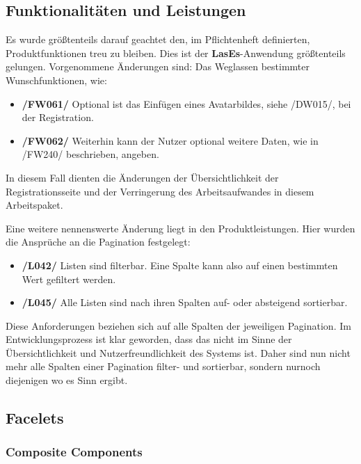 \subsection{Funktionalitäten und Leistungen}

Es wurde größtenteils darauf geachtet den, im Pflichtenheft definierten, Produktfunktionen treu zu bleiben.
Dies ist der \textbf{LasEs}-Anwendung größtenteils gelungen.
Vorgenommene Änderungen sind:
\newline
Das Weglassen bestimmter Wunschfunktionen, wie:
\begin{itemize}
    \item \textbf{/FW061/} Optional ist das Einfügen eines Avatarbildes, siehe /DW015/, bei der Registration.
    \item \textbf{/FW062/} Weiterhin kann der Nutzer optional weitere Daten, wie in /FW240/ beschrieben, angeben.
\end{itemize}
In diesem Fall dienten die Änderungen der Übersichtlichkeit der Registrationsseite und der
Verringerung des Arbeitsaufwandes in diesem Arbeitspaket.

\newline
Eine weitere nennenswerte Änderung liegt in den Produktleistungen.
Hier wurden die Ansprüche an die Pagination festgelegt:
\begin{itemize}
    \item \textbf{/L042/} Listen sind filterbar.
    Eine Spalte kann also auf einen bestimmten Wert gefiltert werden.
    \item \textbf{/L045/} Alle Listen sind nach ihren Spalten auf- oder absteigend sortierbar.
\end{itemize}
Diese Anforderungen beziehen sich auf alle Spalten der jeweiligen Pagination.
Im Entwicklungsprozess ist klar geworden, dass das nicht im Sinne der Übersichtlichkeit
und Nutzerfreundlichkeit des Systems ist.
Daher sind nun nicht mehr alle Spalten einer Pagination filter- und sortierbar,
sondern nurnoch diejenigen wo es Sinn ergibt.

\subsection{Facelets}

\subsubsection{Composite Components}

